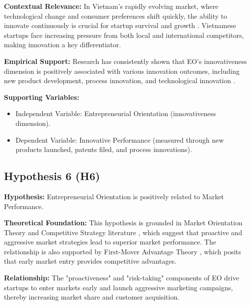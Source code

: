 \documentclass[../Main.tex]{subfiles}
\begin{document}
    \textbf{Contextual Relevance:} In Vietnam's rapidly evolving market, where technological change and consumer preferences shift quickly, the ability to innovate continuously is crucial for startup survival and growth \cite{vietnam_innovation_report_2024}. Vietnamese startups face increasing pressure from both local and international competitors, making innovation a key differentiator.
    
    \textbf{Empirical Support:} Research has consistently shown that EO's innovativeness dimension is positively associated with various innovation outcomes, including new product development, process innovation, and technological innovation \cite{lumpkin1996clarifying, wiklund2003knowledge}.
    
    \textbf{Supporting Variables:}
    \begin{itemize}
        \item Independent Variable: Entrepreneurial Orientation (innovativeness dimension).
        \item Dependent Variable: Innovative Performance (measured through new products launched, patents filed, and process innovations).
    \end{itemize}

    \subsection{Hypothesis 6 (H6)}
    \textbf{Hypothesis:} Entrepreneurial Orientation is positively related to Market Performance.
    
    \textbf{Theoretical Foundation:} This hypothesis is grounded in Market Orientation Theory \cite{narver1990effect} and Competitive Strategy literature \cite{porter1980competitive}, which suggest that proactive and aggressive market strategies lead to superior market performance. The relationship is also supported by First-Mover Advantage Theory \cite{lieberman1988first}, which posits that early market entry provides competitive advantages.
    
    \textbf{Relationship:} The "proactiveness" and "risk-taking" components of EO drive startups to enter markets early and launch aggressive marketing campaigns, thereby increasing market share and customer acquisition.
    
\end{document}
